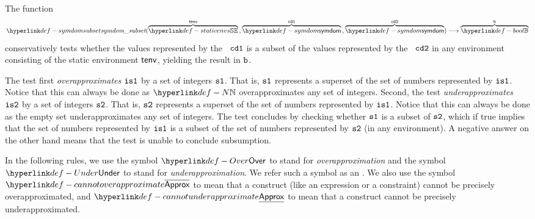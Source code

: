 \hypertarget{def-symdomsubset}{}
The function
\[
  \symdomsubset(
    \overname{\staticenvs}{\tenv} \aslsep
    \overname{\symdom}{\cdone} \aslsep
    \overname{\symdom}{\cdtwo}
  ) \aslto
  \overname{\Bool}{\vb}
\]
conservatively tests whether the values represented by the \symbolicdomain\ $\texttt{cd1}$
is a subset of the values represented by the \symbolicdomain\ $\texttt{cd2}$ in any environment
consisting of the static environment $\textsf{tenv}$, yielding the result in $\texttt{b}$.

The test first \emph{overapproximates} $\texttt{is1}$ by a set of integers $\texttt{s1}$.
That is, $\texttt{s1}$ represents a superset of the set of numbers represented by $\texttt{is1}$.
Notice that this can always be done as $\N$ overapproximates any set of integers.
%
Second, the test \emph{underapproximates} $\texttt{is2}$ by a set of integers $\texttt{s2}$.
That is, $\texttt{s2}$ represents a superset of the set of numbers represented by $\texttt{is1}$.
Notice that this can always be done as the empty set underapproximates any set of integers.
%
The test concludes by checking whether $\texttt{s1}$ is a subset of $\texttt{s2}$,
which if true implies that the set of numbers represented by $\texttt{is1}$ is a subset of the
set of numbers represented by $\texttt{s2}$ (in any environment).
A negative answer on the other hand means that the
test is unable to conclude subsumption.

\hypertarget{def-Under}{}
\hypertarget{def-Over}{}
\hypertarget{def-cannotoverapproximate}{}
\hypertarget{def-cannotunderapproximate}{}
\hypertarget{def-approximationdirectionterm}{}
In the following rules, we use the symbol $\Over$ to stand for \emph{overapproximation}
and the symbol $\Under$ to stand for \emph{underapproximation}.
We refer such a symbol as an \approximationdirectionterm.
We also use the symbol $\CannotOverapproximate$ to mean that a construct
(like an expression or a constraint) cannot be precisely overapproximated,
and $\CannotUnderapproximate$ to mean that a construct cannot be precisely
underapproximated.

